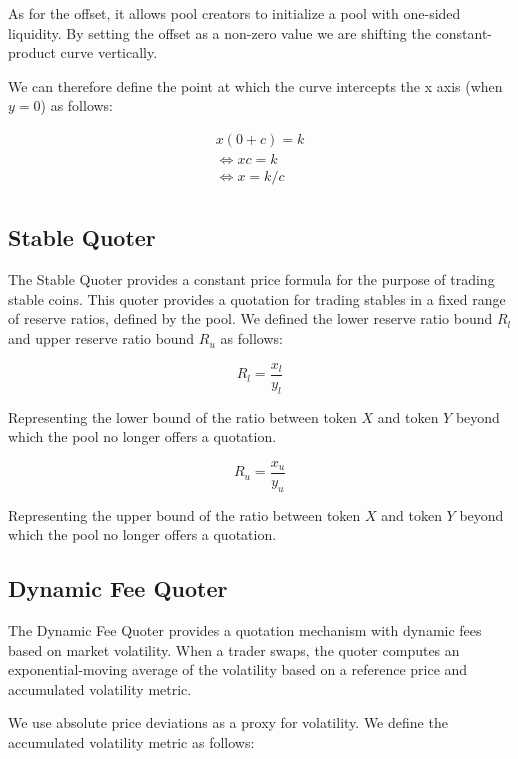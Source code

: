 \documentclass[sigconf,nonacm,prologue,table]{acmart}
\numberwithin{equation}{section}
\theoremstyle{definition}
\theoremstyle{remark}
\begin{document}
As for the offset, it allows pool creators to initialize a pool with one-sided liquidity. By setting the offset as a non-zero value we are shifting the constant-product curve vertically.

We can therefore define the point at which the curve intercepts the x axis (when $y=0$) as follows:

\begin{gather*}
    x(0+c) = k \\
    \iff xc = k \\
    \iff x = k / c \\
\tag{5.5}
\end{gather*}

\subsection{Stable Quoter} \label{stablequoter}

The Stable Quoter provides a constant price formula for the purpose of trading stable coins. This quoter provides a quotation for trading stables in a fixed range of reserve ratios, defined by the pool. We defined the lower reserve ratio bound $R_l$ and upper reserve ratio bound $R_u$ as follows:

\begin{equation}
R_l = \frac{x_l}{y_l}
\tag{5.2.1}
\end{equation}

Representing the lower bound of the ratio between token $X$ and token $Y$ beyond which the pool no longer offers a quotation.

\begin{equation}
R_u = \frac{x_u}{y_u}
\tag{5.2.2}
\end{equation}

Representing the upper bound of the ratio between token $X$ and token $Y$ beyond which the pool no longer offers a quotation.

\subsection{Dynamic Fee Quoter} \label{dynamicfeequoter}

The Dynamic Fee Quoter provides a quotation mechanism with dynamic fees based on market volatility. When a trader swaps, the quoter computes an exponential-moving average of the volatility based on a reference price and accumulated volatility metric.

We use absolute price deviations as a proxy for volatility. We define the accumulated volatility metric as follows:
\end{document}
